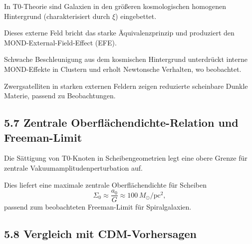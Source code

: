 	In T0-Theorie sind Galaxien in den größeren kosmologischen homogenen Hintergrund (charakterisiert durch $\xi$) eingebettet.
	
	Dieses externe Feld bricht das starke Äquivalenzprinzip und produziert den MOND-External-Field-Effect (EFE).
	
	Schwache Beschleunigung aus dem kosmischen Hintergrund unterdrückt interne MOND-Effekte in Clustern und erholt Newtonsche Verhalten, wo beobachtet.
	
	Zwergsatelliten in starken externen Feldern zeigen reduzierte scheinbare Dunkle Materie, passend zu Beobachtungen.
	
	\subsection{5.7 Zentrale Oberflächendichte-Relation und Freeman-Limit}
	
	Die Sättigung von T0-Knoten in Scheibengeometrien legt eine obere Grenze für zentrale Vakuumamplitudenperturbation auf.
	
	Dies liefert eine maximale zentrale Oberflächendichte für Scheiben
	\[
	\Sigma_0 \approx \frac{a_0}{G} \approx 100 \, M_\odot / \text{pc}^2,
	\]
	passend zum beobachteten Freeman-Limit für Spiralgalaxien.
	
	\subsection{5.8 Vergleich mit CDM-Vorhersagen}
	
	\begin{table}[htbp]
		\centering
		\caption{Vorhersagen auf galaktischer Skala}
		\label{tab:galaktisch}
	\end{table}
	
